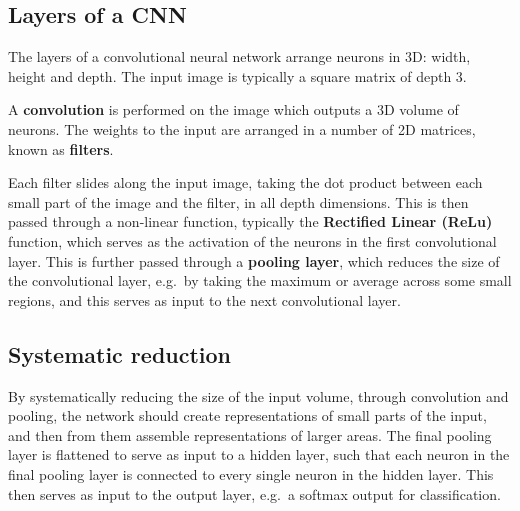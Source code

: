 \documentclass[%
oneside,                 %
final,                   %
10pt]{article}
\begin{document}
\subsection*{Layers of a CNN}
The layers of a convolutional neural network arrange neurons in 3D: width, height and depth.  
The input image is typically a square matrix of depth 3. 

A \textbf{convolution} is performed on the image which outputs
a 3D volume of neurons. The weights to the input are arranged in a number of 2D matrices, known as \textbf{filters}.


Each filter slides along the input image, taking the dot product
between each small part of the image and the filter, in all depth
dimensions. This is then passed through a non-linear function,
typically the \textbf{Rectified Linear (ReLu)} function, which serves as the
activation of the neurons in the first convolutional layer. This is
further passed through a \textbf{pooling layer}, which reduces the size of the
convolutional layer, e.g.~by taking the maximum or average across some
small regions, and this serves as input to the next convolutional
layer.


\subsection*{Systematic reduction}

By systematically reducing the size of the input volume, through
convolution and pooling, the network should create representations of
small parts of the input, and then from them assemble representations
of larger areas.  The final pooling layer is flattened to serve as
input to a hidden layer, such that each neuron in the final pooling
layer is connected to every single neuron in the hidden layer. This
then serves as input to the output layer, e.g.~a softmax output for
classification.


\end{document}
